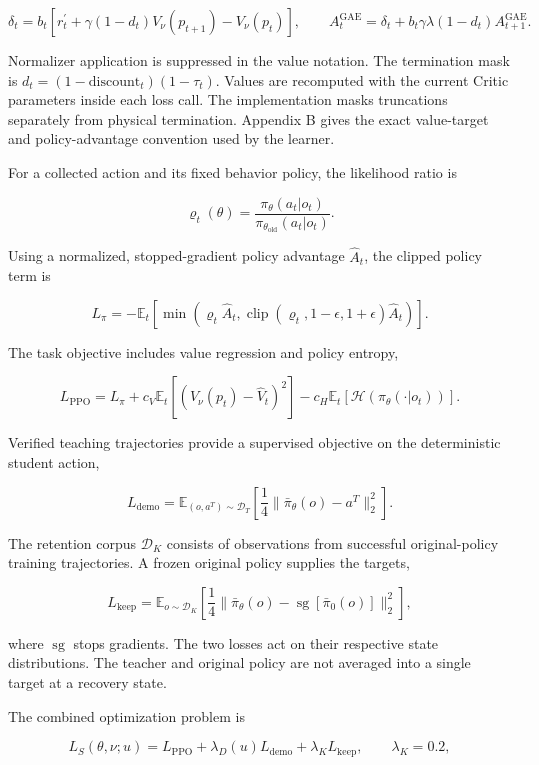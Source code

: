 \documentclass[
  american,
  11pt,
  a4paper,
]{article}
\begin{document}
\[
\delta_t=b_t\!\left[r_t^\prime+\gamma(1-d_t)V_\nu(p_{t+1})-V_\nu(p_t)\right],
\qquad
A_t^{\mathrm{GAE}}=\delta_t+
b_t\gamma\lambda(1-d_t)A_{t+1}^{\mathrm{GAE}}.
\tag{25}\label{eq:25}
\]

Normalizer application is suppressed in the value notation. The
termination mask is \(d_t=(1-\mathrm{discount}_t)(1-\tau_t)\). Values
are recomputed with the current Critic parameters inside each loss call.
The implementation masks truncations separately from physical
termination. Appendix B gives the exact value-target and
policy-advantage convention used by the learner.

For a collected action and its fixed behavior policy, the likelihood
ratio is

\[
\varrho_t(\theta)=
\frac{\pi_\theta(a_t|o_t)}{\pi_{\theta_{\mathrm{old}}}(a_t|o_t)}.
\tag{26}\label{eq:26}
\]

Using a normalized, stopped-gradient policy advantage \(\widehat A_t\),
the clipped policy term is

\[
L_\pi=
-\mathbb E_t\!\left[
\min\left(\varrho_t\widehat A_t,
\operatorname{clip}(\varrho_t,1-\epsilon,1+\epsilon)\widehat A_t\right)
\right].
\tag{27}\label{eq:27}
\]

The task objective includes value regression and policy entropy,

\[
L_{\mathrm{PPO}}=L_\pi+c_V\mathbb E_t[(V_\nu(p_t)-\widehat V_t)^2]
-c_H\mathbb E_t[\mathcal H(\pi_\theta(\cdot|o_t))].
\tag{28}\label{eq:28}
\]

Verified teaching trajectories provide a supervised objective on the
deterministic student action,

\[
L_{\mathrm{demo}}=
\mathbb E_{(o,a^T)\sim\mathcal D_T}
\left[\frac14\|\bar\pi_\theta(o)-a^T\|_2^2\right].
\tag{29}\label{eq:29}
\]

The retention corpus \(\mathcal D_K\) consists of observations from
successful original-policy training trajectories. A frozen original
policy supplies the targets,

\[
L_{\mathrm{keep}}=
\mathbb E_{o\sim\mathcal D_K}
\left[\frac14\|\bar\pi_\theta(o)-
\operatorname{sg}[\bar\pi_0(o)]\|_2^2\right],
\tag{30}\label{eq:30}
\]

where \(\operatorname{sg}\) stops gradients. The two losses act on their
respective state distributions. The teacher and original policy are not
averaged into a single target at a recovery state.

The combined optimization problem is

\[
L_S(\theta,\nu;u)=
L_{\mathrm{PPO}}+\lambda_D(u)L_{\mathrm{demo}}+\lambda_K L_{\mathrm{keep}},
\qquad \lambda_K=0.2,
\tag{31}\label{eq:31}
\]
\end{document}
